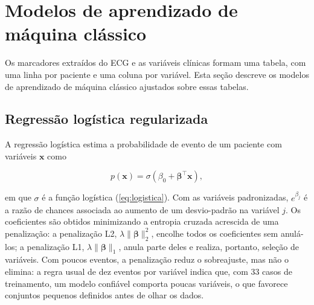 %
%

\section{Modelos de aprendizado de máquina clássico}
\label{sec:fund-tabulares}

Os marcadores extraídos do \gls{ECG} e as variáveis clínicas formam uma
tabela, com uma linha por paciente e uma coluna por variável. Esta seção
descreve os modelos de aprendizado de máquina clássico ajustados sobre essas
tabelas.

\subsection{Regressão logística regularizada}
\label{subsec:fund-logistica}

A regressão logística estima a probabilidade de evento de um paciente com
variáveis $\mathbf{x}$ como

\begin{equation}
	p(\mathbf{x}) = \sigma\!\left(\beta_0 + \boldsymbol{\beta}^{\top}\mathbf{x}\right),
	\label{eq:reg-logistica}
\end{equation}

\noindent
em que $\sigma$ é a função logística (\autoref{eq:logistica}). Com as
variáveis padronizadas, $e^{\beta_j}$ é a razão de chances associada ao
aumento de um desvio-padrão na variável $j$. Os coeficientes são obtidos
minimizando a entropia cruzada acrescida de uma penalização: a penalização
L2, $\lambda \lVert \boldsymbol{\beta} \rVert_2^2$, encolhe todos os
coeficientes sem anulá-los; a penalização L1,
$\lambda \lVert \boldsymbol{\beta} \rVert_1$, anula parte deles e realiza,
portanto, seleção de variáveis. Com poucos eventos, a penalização reduz o
sobreajuste, mas não o elimina: a regra usual de dez eventos por variável
\cite{peduzzi1996simulation} indica que, com 33 casos de treinamento, um
modelo confiável comporta poucas variáveis, o que favorece conjuntos
pequenos definidos antes de olhar os dados.

